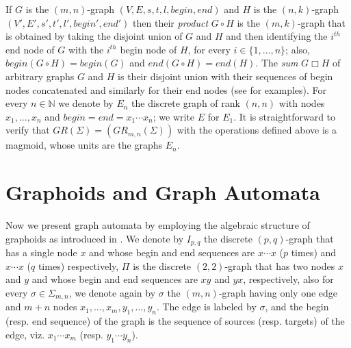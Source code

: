 \documentclass[runningheads,a4paper]{llncs}
\newcommand{\bx}{\mathbin{\Box}}
\begin{document}
If $G$ is the $(m,n)$-graph  $(V,E,s,t,l,begin,end)$ and $H$ is the $(n,k)$-graph  $(V',E',s',t',l',begin',end')$ then their \emph{product} $G\circ
H$ is the $(m,k)$-graph that is obtained by taking the disjoint union of $G$ and $H$ and then identifying
the $i^{th}$ end node of $G$ with the $i^{th}$ begin node of $H$, for every $i\in \{1,...,n\}$; also, $begin(G\circ H)=begin(G)$ and
$end(G\circ H)=end(H)$. The \emph{sum} $G \bx H$ of arbitrary graphs $G$ and $H$ is their disjoint union with their sequences of begin nodes concatenated and similarly for their end nodes (see \cite{BK3,Kal2} for examples). For every $n\in \mathbb{N}$ we denote by $E_n$ the discrete graph
of rank $(n,n)$ with nodes $x_1,...,x_n$ and $begin =end =x_1\cdots x_n$; we write $E$ for $E_1$.  It is straightforward to verify that $GR(\Sigma )=(GR_{m,n}(\Sigma))$ with the operations  defined above is a magmoid, whose units are the graphs $E_n$.

\section{Graphoids and Graph Automata}\label{S:3}


Now we present graph automata by employing the algebraic structure of graphoids as introduced in \cite{BK3}. We denote by $I_{p,q}$ the discrete $(p,q)$-graph that has a single node $x$ and whose begin and end sequences are $x\cdots x$ ($p$ times) and $x\cdots x$ ($q$ times) respectively, $\Pi$ is the discrete $(2,2)$-graph that has two nodes $x$ and $y$ and whose begin and end sequences are $xy$ and $yx$, respectively, also for every $\sigma\in\Sigma_{m,n}$, we denote again by $\sigma$ the $(m,n)$-graph having only one edge and $m+n$ nodes $x_1,\dots ,x_m,y_1,\dots ,y_n$. The edge is labeled by $\sigma$, and the begin (resp. end sequence) of the graph is the sequence of sources (resp. targets) of the edge, viz. $x_1\cdots x_m$ (resp.
$y_1\cdots y_n$).

\vspace{4mm}
\end{document}
